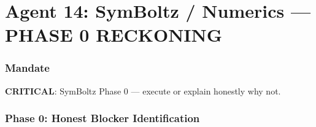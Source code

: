 \documentclass[11pt,a4paper]{article}
\begin{document}
\part{Agent 14: SymBoltz / Numerics --- PHASE 0 RECKONING}
\label{part:agent14}

\section{Mandate}

\textbf{CRITICAL}: SymBoltz Phase 0 --- execute or explain honestly why not.

\section{Phase 0: Honest Blocker Identification}
\end{document}
